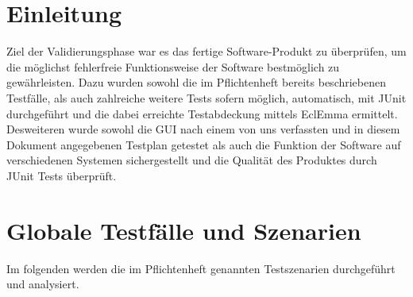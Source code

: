 \documentclass[12pt,a4paper,titlepage]{article}
\begin{document}
\section{Einleitung}

Ziel der Validierungsphase war es das fertige Software-Produkt zu überprüfen, um die möglichst fehlerfreie Funktionsweise der Software bestmöglich zu gewährleisten. Dazu wurden sowohl die im Pflichtenheft bereits beschriebenen Testfälle, als auch zahlreiche weitere Tests sofern möglich, automatisch, mit JUnit durchgeführt und die dabei erreichte Testabdeckung mittels EclEmma ermittelt.
Desweiteren wurde sowohl die GUI nach einem von uns verfassten und in diesem Dokument angegebenen Testplan getestet als auch die Funktion der Software auf verschiedenen Systemen sichergestellt und die Qualität des Produktes durch JUnit Tests überprüft.

\section{Globale Testfälle und Szenarien}
Im folgenden werden die im Pflichtenheft genannten Testszenarien durchgeführt und analysiert.
\end{document}
